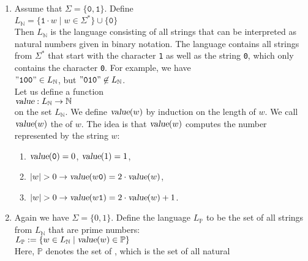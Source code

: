 \examplesEng
\begin{enumerate}
\item Assume that $\Sigma = \{\mathtt{0},\mathtt{1}\}$.  Define
      \\[0.2cm]
      \hspace*{1.3cm}
      $L_\mathbb{N} = \{ \mathtt{1} \cdot w \mid w \in \Sigma^* \} \cup \{ \mathtt{0} \}$
      \\[0.2cm]
      Then $L_\mathbb{N}$ is the language consisting of all strings that can be interpreted as
      natural numbers given in binary notation.  The language contains all strings from $\Sigma^*$  that start with 
      the character \texttt{1} as well as the string \texttt{0}, which only contains the character
      \texttt{0}.  For example, we have
      \\[0.2cm]
      \hspace*{1.3cm}
      $\mathtt{\symbol{34}100\symbol{34}} \in L_\mathbb{N}$, \quad but \quad $\mathtt{\symbol{34}010\symbol{34}} \not\in L_\mathbb{N}$.
      \\[0.2cm]
      Let us define a function 
      \\[0.2cm]
      \hspace*{1.3cm}
      $\textsl{value}: L_\mathbb{N} \rightarrow \mathbb{N}$
      \\[0.2cm]
      on the set $L_\mathbb{N}$.  We define $\textsl{value}(w)$ by induction on the length of $w$.
      We call $\textsl{value}(w)$ the  of $w$.  The idea is that
      $\textsl{value}(w)$ computes the number represented by the string $w$:
      \begin{enumerate}
      \item $\textsl{value}(\mathtt{0}) = 0$, $\textsl{value}(1) = 1$,
      \item $|w| > 0 \rightarrow \textsl{value}(w\mathtt{0}) = 2 \cdot \textsl{value}(w)   $,
      \item $|w| > 0 \rightarrow \textsl{value}(w\mathtt{1}) = 2 \cdot \textsl{value}(w) + 1$.
      \end{enumerate}
\item Again we have $\Sigma = \{0,1\}$. Define the language $L_\mathbb{P}$
      to be the set of all strings from $L_\mathbb{N}$ that are prime numbers:
      \\[0.2cm]
      \hspace*{1.3cm}
      $L_\mathbb{P} := \{ w \in L_\mathbb{N} \mid \textsl{value}(w) \in \mathbb{P} \}$
      \\[0.2cm]
      Here, $\mathbb{P}$ denotes the set of ,  which is the set of all natural

\end{enumerate}
